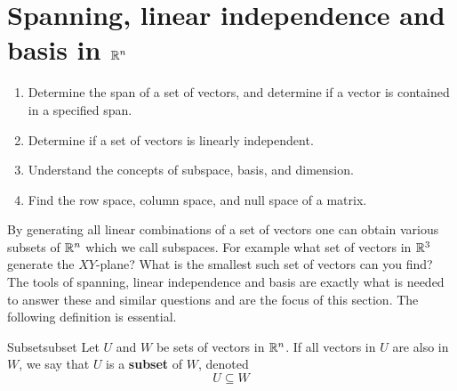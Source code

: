 \newpage
\section{Spanning, linear independence and basis in \texorpdfstring{$\mathbb{R}^{n}$}{Rn}}

\begin{outcome}
  \begin{enumerate}
  \item Determine the span of a set of vectors, and determine if a
    vector is contained in a specified span.
  \item Determine if a set of vectors is linearly independent.
  \item Understand the concepts of subspace, basis, and dimension.
  \item Find the row space, column space, and null space of a matrix.
  \end{enumerate}
\end{outcome}

By generating all linear combinations of a set of vectors one can
obtain various subsets of $\mathbb{R}^{n}$ which we call
subspaces. For example what set of vectors in $\mathbb{R}^{3}$
generate the $XY$-plane? What is the smallest such set of vectors can
you find? The tools of spanning, linear independence and basis are
exactly what is needed to answer these and similar questions and are the focus of this section. The following definition is essential.

\begin{definition}{Subset}{subset}
Let $U$ and $W$ be sets of vectors in $\mathbb{R}^n$. If all vectors in $U$ are also in $W$, we say that $U$ is a \textbf{subset} of $W$, denoted 
\[
U \subseteq W
\]
\end{definition}
